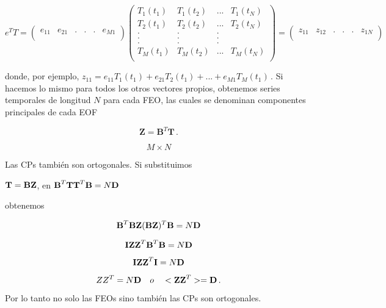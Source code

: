\documentclass[
]{agujournal2019}
\begin{document}
\begin{equation}
{e}^T{T}=\left(\begin{array}{ccccccc}
   e_{11} &
   e_{21} & . & . & . & e_{M1} \\
        \end{array}\right)
    \left(\begin{array}{cccc}
   T_{1}(t_1) & T_{1}(t_2) & ... & T_{1}(t_N)\\
   T_{2}(t_1) & T_{2}(t_2) & ... & T_{2}(t_N)\\
        . & . & . \\
        . & . & . \\
        . & . & . \\
   T_{M}(t_1) & T_{M}(t_2) & ... & T_{M}(t_N)\\
        \end{array}\right)=
    \left(\begin{array}{ccccccc}
   z_{11} &
   z_{12} & . & . & . & z_{1N} \\
        \end{array}\right)
\end{equation}

donde, por ejemplo,
\(z_{11}=e_{11}T_1(t_1)+ e_{21}T_2(t_1) + ... + e_{M1}T_M(t_1)\,.\) Si
hacemos lo mismo para todos los otros vectores propios, obtenemos series
temporales de longitud \(N\) para cada FEO, las cuales se denominan
componentes principales de cada EOF

\[ \textbf {Z}=\textbf {B}^T\textbf {T}\,.\]

\[M\times N \]

Las CPs también son ortogonales. Si substituimos

\({\textbf T}={\textbf B}{\textbf Z}\), en
\({\textbf B}^T{\textbf T}{\textbf T}^T{\textbf B}=N{\textbf D}\)

obtenemos

\[ {\textbf B}^T{\textbf B}{\textbf Z}({\textbf B}{\textbf Z})^T{\textbf B}=N{\textbf D}\]

\[{\textbf I}{\textbf Z}{\textbf Z}^T{\textbf B}^T{\textbf B}= N{\textbf D}\]

\[{\textbf I}{\textbf Z}{\textbf Z}^T{\textbf I}=N{\textbf D}\]

\[ {Z}{Z}^T=N{\textbf D}\,\,\,\,\,\,{ o}\,\,\,\,\,\,<{\textbf Z}{\textbf Z}^T>={\textbf D}\,.\]

Por lo tanto no solo las FEOs sino también las CPs son ortogonales.

\vspace{0.25cm}
\end{document}
